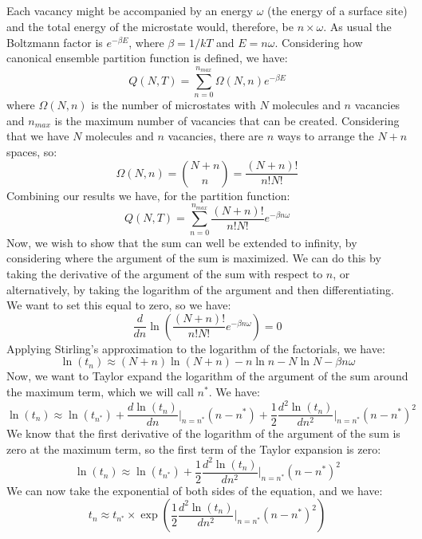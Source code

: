 \documentclass[10pt]{article}
\begin{document}
\subsection{}
Each vacancy might be accompanied by an energy $\omega$ (the energy of a surface site) and the total energy of the microstate would, therefore, be $n\times \omega$.
As usual the Boltzmann factor is $e^{-\beta E}$, where $\beta=1/kT$ and $E=n\omega$.
Considering how canonical ensemble partition function is defined, we have:
\begin{equation}
  Q(N,T)=\sum_{n=0}^{n_{max}}\Omega (N,n)e^{-\beta E}
\end{equation}
where $\Omega (N,n)$ is the number of microstates with $N$ molecules and $n$ vacancies and $n_{max}$ is the maximum number of vacancies that can be created.
Considering that we have $N$ molecules and $n$ vacancies, there are $n$ ways to arrange the $N+n$ spaces, so:
\begin{equation}
  \Omega (N,n)= \binom{N+n}{n} = \frac{(N+n)!}{n!N!}
\end{equation}
Combining our results we have, for the partition function:
\begin{equation}
  Q(N,T)=\sum_{n=0}^{n_{max}}\frac{(N+n)!}{n!N!}e^{-\beta n\omega}
\end{equation}
Now, we wish to show that the sum can well be extended to infinity, by considering where the argument of the sum is maximized. We can do this by taking the derivative of the argument of the sum with respect to $n$, or alternatively, by taking the logarithm of the argument and then differentiating. We want to set this equal to zero, so we have:
\begin{equation}
  \frac{d}{dn}\ln\left(\frac{(N+n)!}{n!N!}e^{-\beta n\omega}\right)=0
\end{equation}
Applying Stirling's approximation to the logarithm of the factorials, we have:
\begin{equation}
  \ln(t_{n}) \approx (N+n)\ln (N+n)-n\ln n-N\ln N-\beta n\omega
\end{equation}
Now, we want to Taylor expand the logarithm of the argument of the sum around the maximum term, which we will call $n^{*}$. We have:
\begin{equation}
  \ln(t_{n}) \approx \ln(t_{n^{*}})+\frac{d\ln(t_{n})}{dn}\bigg|_{n=n^{*}}(n-n^{*})+\frac{1}{2}\frac{d^2\ln(t_{n})}{dn^2}\bigg|_{n=n^{*}}(n-n^{*})^2
\end{equation}
We know that the first derivative of the logarithm of the argument of the sum is zero at the maximum term, so the first term of the Taylor expansion is zero:
\begin{equation}
  \ln(t_{n}) \approx \ln (t_{n^{*}})+\frac{1}{2}\frac{d^2\ln(t_{n})}{dn^2}\bigg|_{n=n^{*}}(n-n^{*})^2
\end{equation}
We can now take the exponential of both sides of the equation, and we have:
\begin{equation}
  t_{n} \approx t_{n^{*}}\times \exp\left(\frac{1}{2}\frac{d^2\ln(t_{n})}{dn^2}\bigg|_{n=n^{*}}(n-n^{*})^2\right)
\end{equation}
\end{document}
